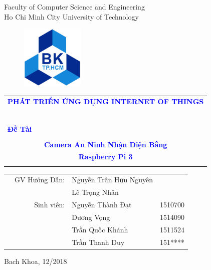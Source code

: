 \documentclass[a4paper]{article}
\begin{document}
\begin{titlepage}
\begin{center}
Faculty of Computer Science and Engineering\\
Ho Chi Minh City University of Technology
\end{center}

\vspace{.51cm}

\begin{figure}[h!]
\begin{center}
\includegraphics[width=3cm]{LogoBK.jpg}
\end{center}
\end{figure}

\vspace{0.5cm}


\begin{center}
\begin{tabular}{c}
\multicolumn{1}{l}{\textbf{{\Large \textcolor{blue}{PHÁT TRIỂN ỨNG DỤNG INTERNET OF THINGS}}}}\\
~~\\
\hline
\\
\multicolumn{1}{l}{\textbf{{\Large \textcolor{blue}{Đề Tài}}}}\\
\\
\textbf{{\Huge \textcolor{blue}{Camera An Ninh Nhận Diện Bằng}}} \\
\textbf{{\Huge \textcolor{blue}{Raspberry Pi 3}}}\\
\\
\hline
\end{tabular}
\end{center}

\vspace{3cm}

\begin{table}[h]
\begin{tabular}{rrll}
\hspace{5 cm} & GV Hướng Dẫn: & Nguyễn Trần Hữu Nguyên&\\
& & Lê Trọng Nhân & \\
& Sinh viên: & Nguyễn Thành Đạt & 1510700 \\
& & Dương Vọng & 1514090 \\ 
& & Trần Quốc Khánh & 1511524\\ 
& & Trần Thanh Duy& 151****\\ 
\end{tabular}
\end{table}

\begin{center}
{\footnotesize Bach Khoa, 12/2018}
\end{center}
\end{titlepage}
\end{document}
